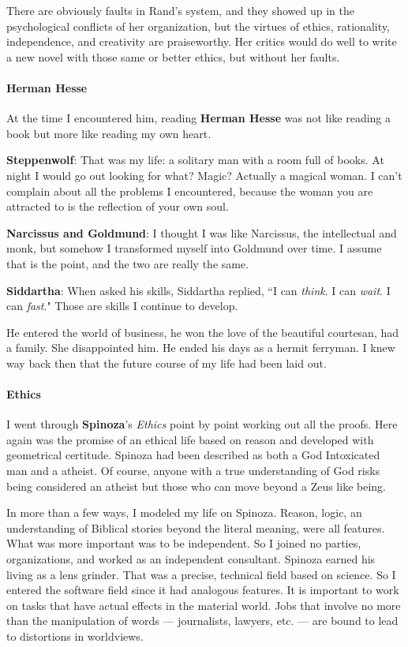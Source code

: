 There are obviously faults in Rand's system, and they showed up in the psychological conflicts of her organization, but the virtues of ethics, rationality, independence, and creativity are praiseworthy. Her critics would do well to write a new novel with those same or better ethics, but without her faults.

\paragraph{Herman Hesse}
At the time I encountered him, reading \textbf{Herman Hesse} was not like reading a book but more like reading my own heart.

\textbf{Steppenwolf}: That was my life: a solitary man with a room full of books. At night I would go out looking for what? Magic? Actually a magical woman. I can't complain about all the problems I encountered, because the woman you are attracted to is the reflection of your own soul.

\textbf{Narcissus and Goldmund}: I thought I was like Narcissus, the intellectual and monk, but somehow I transformed myself into Goldmund over time. I assume that is the point, and the two are really the same.

\textbf{Siddartha}: When asked his skills, Siddartha replied, ``I can \emph{think}. I can \emph{wait}. I can \emph{fast}." Those are skills I continue to develop.

He entered the world of business, he won the love of the beautiful courtesan, had a family. She disappointed him. He ended his days as a hermit ferryman. I knew way back then that the future course of my life had been laid out.

\paragraph{Ethics}
I went through \textbf{Spinoza}'s \emph{Ethics} point by point working out all the proofs. Here again was the promise of an ethical life based on reason and developed with geometrical certitude. Spinoza had been described as both a God Intoxicated man and a atheist. Of course, anyone with a true understanding of God risks being considered an atheist but those who can move beyond a Zeus like being.

In more than a few ways, I modeled my life on Spinoza. Reason, logic, an understanding of Biblical stories beyond the literal meaning, were all features. What was more important was to be independent. So I joined no parties, organizations, and worked as an independent consultant. Spinoza earned his living as a lens grinder. That was a precise, technical field based on science. So I entered the software field since it had analogous features. It is important to work on tasks that have actual effects in the material world. Jobs that involve no more than the manipulation of words — journalists, lawyers, etc. — are bound to lead to distortions in worldviews.

